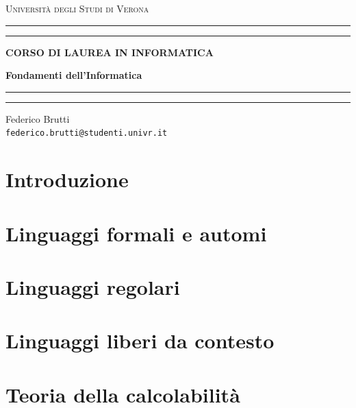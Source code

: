 \documentclass[12pt, a4paper, oneside]{book}
\begin{document}
	
	\begin{titlepage}
		\begin{center}
			{{\LARGE{\textsc{Università degli Studi di Verona}}}} \rule[0.1cm]{15.8cm}{0.1mm}
			\rule[0.5cm]{15.8cm}{0.6mm}
			{\small{\bf CORSO DI LAUREA IN INFORMATICA}}
		\end{center}
		\vspace{12.5mm}
		
		\begin{center}
			{\Huge{\bf Fondamenti dell'Informatica}}
		\end{center}
		\vspace{130mm}
		
		\begin{minipage}[l]{1.8mm}
			\rule[0.1cm]{0.1mm}{2cm}
			\rule[0.1cm]{0.6mm}{2cm}
		\end{minipage}
		\hspace{2mm}
		\begin{minipage}{10cm}	
			{\large{Federico Brutti\\
			\texttt{federico.brutti@studenti.univr.it}}}
		\end{minipage}
	\end{titlepage}
	
	\blankpage
	\tableofcontents
	
	\chapter{Introduzione}
	
	\chapter{Linguaggi formali e automi}
	
	\chapter{Linguaggi regolari}
	
	\chapter{Linguaggi liberi da contesto}
	
	\chapter{Teoria della calcolabilità}
	
\end{document}
